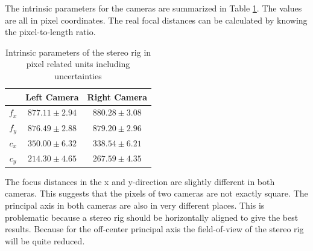 The intrinsic parameters for the cameras are summarized in Table
\ref{chap3:tab-intrinsic-stereo}. The values are all in pixel coordinates. The real focal
distances can be calculated by knowing the pixel-to-length ratio.
\begin{table}[htbp]
  \centering
    \begin{tabular}{|c|c|c|} 
        \hline
                & Left Camera       & Right Camera \\
        \hline
        $f_x$   & $877.11\pm 2.94$  & $880.28\pm 3.08$  \\
        $f_y$   & $876.49\pm 2.88$  & $879.20\pm 2.96$  \\
        \hline
        $c_x$   & $350.00\pm 6.32$  & $338.54\pm 6.21$ \\
        $c_y$   & $214.30\pm 4.65$ & $267.59\pm 4.35$  \\
        \hline
    \end{tabular}
    \caption{Intrinsic parameters of the stereo rig in pixel related units including
    uncertainties}
    \label{chap3:tab-intrinsic-stereo}
\end{table}
The focus distances in the x and y-direction are slightly different in both cameras. This
suggests that the pixels of two cameras are not exactly square. The principal axis in both
cameras are also in very different places. This is problematic because a stereo rig should
be horizontally aligned to give the best results. Because for the off-center principal
axis the field-of-view of the stereo rig will be quite reduced.

